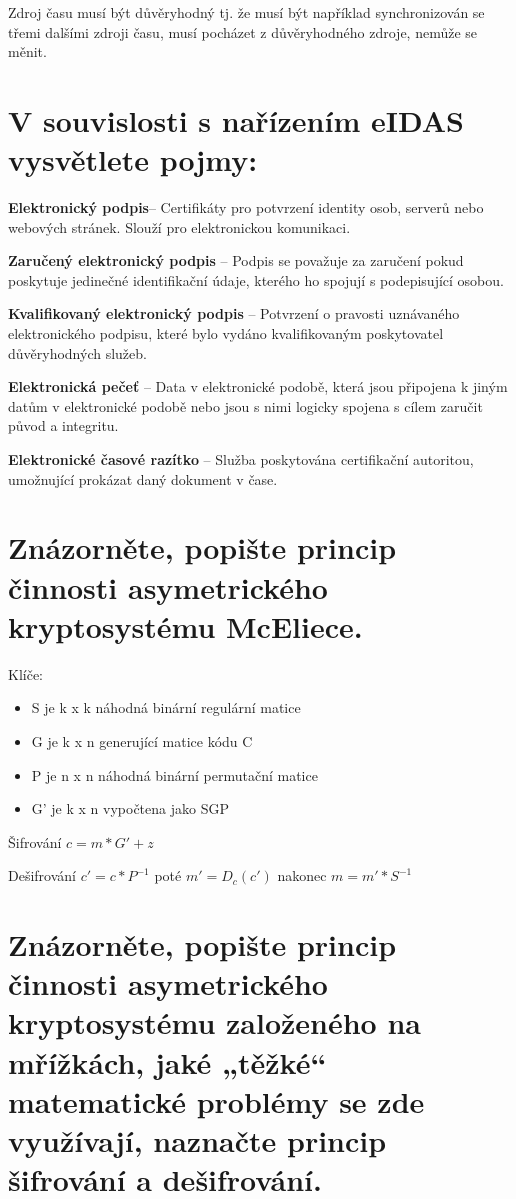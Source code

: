 Zdroj času musí být důvěryhodný tj. že musí být například synchronizován se třemi dalšími zdroji času, musí pocházet z důvěryhodného zdroje, nemůže se měnit.

\section{V souvislosti s nařízením eIDAS vysvětlete pojmy:}

\textbf{Elektronický podpis}-- Certifikáty pro potvrzení identity osob, serverů nebo webových stránek. Slouží pro elektronickou komunikaci.

\textbf{Zaručený elektronický podpis} -- Podpis se považuje za zaručení pokud poskytuje jedinečné identifikační údaje, kterého ho spojují s podepisující osobou.

\textbf{Kvalifikovaný elektronický podpis} -- Potvrzení o pravosti uznávaného elektronického podpisu, které bylo vydáno kvalifikovaným poskytovatel důvěryhodných služeb.

\textbf{Elektronická pečeť} -- Data v elektronické podobě, která jsou připojena k jiným datům v elektronické podobě nebo jsou s nimi logicky spojena s cílem zaručit původ a integritu.

\textbf{Elektronické časové razítko} -- Služba poskytována certifikační autoritou, umožnující prokázat daný dokument v čase.

\section{Znázorněte, popište princip činnosti asymetrického kryptosystému McEliece.}

Klíče:
\begin{itemize}
    \item S je k x k náhodná binární regulární matice
    \item G je k x n generující matice kódu C
    \item P je n x n náhodná binární permutační matice
    \item G' je k x n vypočtena jako SGP
\end{itemize}

Šifrování $c = m * G' + z$

Dešifrování $c' = c * P^{-1}$ poté $m' = D_c(c')$ nakonec $m = m' * S^{-1}$

\section{Znázorněte, popište princip činnosti asymetrického kryptosystému založeného na mřížkách, jaké „těžké“ matematické problémy se zde využívají, naznačte princip šifrování a dešifrování.}

